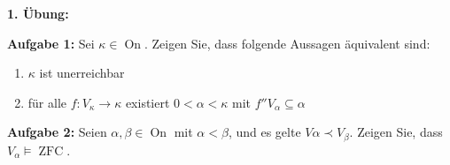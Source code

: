 \documentclass[a4paper,fontsize=11pt]{scrartcl}
\newcommand{\ZFC}{\operatorname{ZFC}}
\newcommand{\On}{\operatorname{On}}
\begin{document}

{\bf 1. Übung:}

{\bf Aufgabe 1:} Sei $\kappa\in\On$. Zeigen Sie, dass folgende
Aussagen äquivalent sind:
\begin{enumerate}
\item $\kappa$ ist unerreichbar
\item für alle $f:V_\kappa\rightarrow\kappa$ existiert
  $0<\alpha<\kappa$ mit $f''V_\alpha\subseteq\alpha$
\end{enumerate}

{\bf Aufgabe 2:} Seien $\alpha,\beta\in\On$ mit $\alpha<\beta$, und es
gelte $V\alpha\prec V_\beta$. Zeigen Sie, dass $V_\alpha\models\ZFC$.
\end{document}
